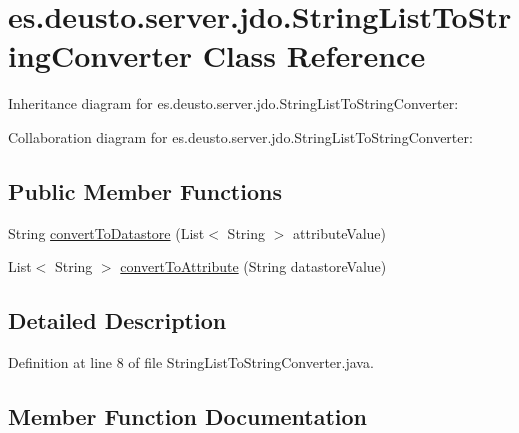 \hypertarget{classes_1_1deusto_1_1server_1_1jdo_1_1_string_list_to_string_converter}{}\section{es.\+deusto.\+server.\+jdo.\+String\+List\+To\+String\+Converter Class Reference}
\label{classes_1_1deusto_1_1server_1_1jdo_1_1_string_list_to_string_converter}


Inheritance diagram for es.\+deusto.\+server.\+jdo.\+String\+List\+To\+String\+Converter\+:


Collaboration diagram for es.\+deusto.\+server.\+jdo.\+String\+List\+To\+String\+Converter\+:
\subsection*{Public Member Functions}
\begin{DoxyCompactItemize}
\item 
String \mbox{\hyperlink{classes_1_1deusto_1_1server_1_1jdo_1_1_string_list_to_string_converter_a97a5081037fd91b4787b2c9cc8992c5f}{convert\+To\+Datastore}} (List$<$ String $>$ attribute\+Value)
\item 
List$<$ String $>$ \mbox{\hyperlink{classes_1_1deusto_1_1server_1_1jdo_1_1_string_list_to_string_converter_a2de7e8189ada32031fcbadd6077f8e7b}{convert\+To\+Attribute}} (String datastore\+Value)
\end{DoxyCompactItemize}


\subsection{Detailed Description}


Definition at line 8 of file String\+List\+To\+String\+Converter.\+java.



\subsection{Member Function Documentation}
\mbox{\label{classes_1_1deusto_1_1server_1_1jdo_1_1_string_list_to_string_converter_a2de7e8189ada32031fcbadd6077f8e7b}} 
